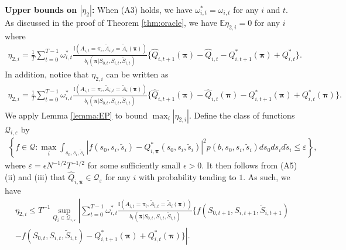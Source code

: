 \documentclass{article}
\newcommand{\Mean}{{\mathbb{E}}}
\begin{document}
\textbf{Upper bounds on $|\eta_2|$: }When (A3) holds, we have $\omega_{i,t}^*=\omega_{i,t}$ for any $i$ and $t$. As discussed in the proof of Theorem \ref{thm:oracle}, we have $\Mean \eta_{2,i}=0$ for any $i$ where
\begin{eqnarray*}
	\eta_{2,i}=
	\frac{1}{T}\sum_{t=0}^{T-1} \omega_{i,t}^*\frac{\mathbb{I}(A_{i,t}=\pi_i,\widetilde{A}_{i,t}=\widetilde{A}_i(\bm{\pi}))}{b_i(\bm{\pi}|S_{0,t},S_{i,t},\widetilde{S}_{i,t})}\{\widehat{Q}_{i,t+1}(\bm{\pi})-\widehat{Q}_{i,t}-Q_{i,t+1}^*(\bm{\pi})+Q_{i,t}^* \}.
\end{eqnarray*}
In addition, notice that $\eta_{2,i}$ can be written as
\begin{eqnarray*}
	\eta_{2,i}=
	\frac{1}{T}\sum_{t=0}^{T-1} \omega_{i,t}^*\frac{\mathbb{I}(A_{i,t}=\pi_i,\widetilde{A}_{i,t}=\widetilde{A}_i(\bm{\pi}))}{b_i(\bm{\pi}|S_{0,t},S_{i,t},\widetilde{S}_{i,t})}\{\widehat{Q}_{i,t+1}(\bm{\pi})-\widehat{Q}_{i,t}(\bm{\pi})-Q_{i,t+1}^*(\bm{\pi})+Q_{i,t}^*(\bm{\pi}) \}.
\end{eqnarray*}
We apply Lemma \ref{lemma:EP} to bound $\max_i |\eta_{2,i}|$. Define the class of functions $\mathcal{Q}_{i,\varepsilon}$ by
\begin{eqnarray*}
	\left\{f \in \mathcal{Q}:\max_i \int_{s_0,s_i,\widetilde{s}_i}|f(s_0,s_i,\widetilde{s}_{i})-Q_{i,\bm{\pi}}^*(s_0,s_i,\widetilde{s}_{i})|^2p(b,s_0,s_i,\tilde{s}_i)ds_0ds_id\tilde{s}_i\le \varepsilon \right\},
\end{eqnarray*}
where $\varepsilon=\epsilon N^{-1/2} T^{-1/2}$ for some sufficiently small $\epsilon>0$. It then follows from (A5)(ii) and (iii) that $\widehat{Q}_{i,\bm{\pi}}\in \mathcal{Q}_{\varepsilon}$ for any $i$ with probability tending to $1$. As such, we have
\begin{eqnarray*}
	\eta_{2,i}\le T^{-1} \sup_{Q_i\in \mathcal{Q}_{i,\varepsilon}} \left|\sum_{t=0}^{T-1} \omega_{i,t}^*\frac{\mathbb{I}(A_{i,t}=\pi_i,\widetilde{A}_{i,t}=\widetilde{A}_i(\bm{\pi}))}{b_i(\bm{\pi}|S_{0,t},S_{i,t},\widetilde{S}_{i,t})}\{f(S_{0,t+1},S_{i,t+1},\widetilde{S}_{i,t+1})\right.\\
	\left.-f(S_{0,t},S_{i,t},\widetilde{S}_{i,t})-Q_{i,t+1}^*(\bm{\pi})+Q_{i,t}^*(\bm{\pi}) \}\right|.
\end{eqnarray*}
\end{document}

